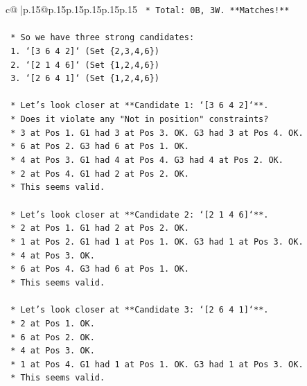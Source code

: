\documentclass{article}
\begin{document}
{\begin{supertabular}{c@{$\;$}|p{.15\linewidth}@{}p{.15\linewidth}p{.15\linewidth}p{.15\linewidth}p{.15\linewidth}p{.15\linewidth}}
{{{\texttt{                            *   Total: 0B, 3W. **Matches!**} \\
\\ 
\texttt{    *   So we have three strong candidates:} \\
\texttt{        1.  `{[}3 6 4 2{]}` (Set \{2,3,4,6\})} \\
\texttt{        2.  `{[}2 1 4 6{]}` (Set \{1,2,4,6\})} \\
\texttt{        3.  `{[}2 6 4 1{]}` (Set \{1,2,4,6\})} \\
\\ 
\texttt{    *   Let's look closer at **Candidate 1: `{[}3 6 4 2{]}`**.} \\
\texttt{        *   Does it violate any "Not in position" constraints?} \\
\texttt{        *   3 at Pos 1. G1 had 3 at Pos 3. OK. G3 had 3 at Pos 4. OK.} \\
\texttt{        *   6 at Pos 2. G3 had 6 at Pos 1. OK.} \\
\texttt{        *   4 at Pos 3. G1 had 4 at Pos 4. G3 had 4 at Pos 2. OK.} \\
\texttt{        *   2 at Pos 4. G1 had 2 at Pos 2. OK.} \\
\texttt{        *   This seems valid.} \\
\\ 
\texttt{    *   Let's look closer at **Candidate 2: `{[}2 1 4 6{]}`**.} \\
\texttt{        *   2 at Pos 1. G1 had 2 at Pos 2. OK.} \\
\texttt{        *   1 at Pos 2. G1 had 1 at Pos 1. OK. G3 had 1 at Pos 3. OK.} \\
\texttt{        *   4 at Pos 3. OK.} \\
\texttt{        *   6 at Pos 4. G3 had 6 at Pos 1. OK.} \\
\texttt{        *   This seems valid.} \\
\\ 
\texttt{    *   Let's look closer at **Candidate 3: `{[}2 6 4 1{]}`**.} \\
\texttt{        *   2 at Pos 1. OK.} \\
\texttt{        *   6 at Pos 2. OK.} \\
\texttt{        *   4 at Pos 3. OK.} \\
\texttt{        *   1 at Pos 4. G1 had 1 at Pos 1. OK. G3 had 1 at Pos 3. OK.} \\
\texttt{        *   This seems valid.} \\
\\ 
}}}
\end{supertabular}}
\end{document}
